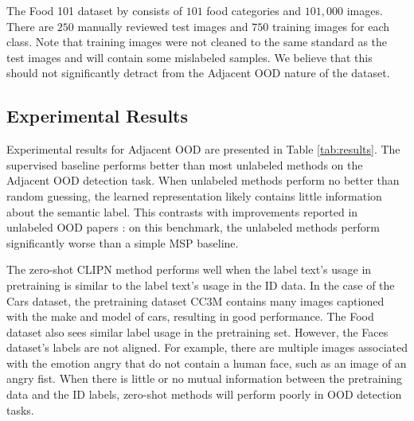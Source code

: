 The Food 101 dataset by \citet{bossard14} consists of $101$ food categories and $101,000$ images. There are $250$ manually reviewed test images and $750$ training images for each class. Note that training images were not cleaned to the same standard as the test images and will contain some mislabeled samples. We believe that this should not significantly detract from the Adjacent OOD nature of the dataset.

\subsection{Experimental Results}

Experimental results for Adjacent OOD are presented in Table \ref{tab:results}. The supervised baseline performs better than most unlabeled methods on the Adjacent OOD detection task. When unlabeled methods perform no better than random guessing, the learned representation likely contains little information about the semantic label. This contrasts with improvements reported in unlabeled OOD papers \citep{sehwag2021ssd, hendrycks2019using, liu2023unsupervised}: on this benchmark, the unlabeled methods perform significantly worse than a simple MSP baseline.

The zero-shot CLIPN method performs well when the label text's usage in pretraining is similar to the label text's usage in the ID data. In the case of the Cars dataset, the pretraining dataset CC3M \citep{sharma2018conceptual} contains many images captioned with the make and model of cars, resulting in good performance. The Food dataset also sees similar label usage in the pretraining set. However, the Faces dataset's labels are not aligned. For example, there are multiple images associated with the emotion angry that do not contain a human face, such as an image of an angry fist. When there is little or no mutual information between the pretraining data and the ID labels, zero-shot methods will perform poorly in OOD detection tasks.


